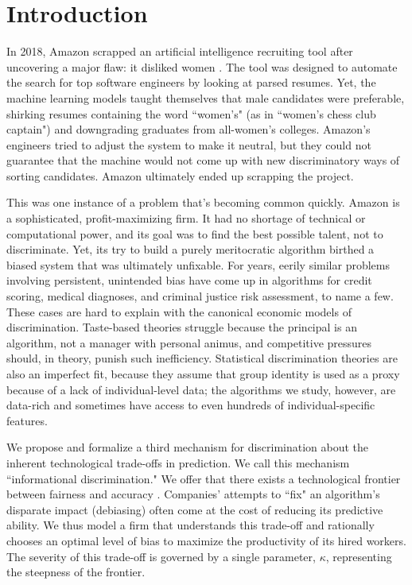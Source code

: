 \section{Introduction}

In 2018, Amazon scrapped an artificial intelligence recruiting tool after uncovering a major flaw: it disliked women \citep{Dastin2018}. The tool was designed to automate the search for top software engineers by looking at parsed resumes. Yet, the machine learning models taught themselves that male candidates were preferable, shirking resumes containing the word ``women's" (as in ``women's chess club captain") and downgrading graduates from all-women's colleges. Amazon's engineers tried to adjust the system to make it neutral, but they could not guarantee that the machine would not come up with new discriminatory ways of sorting candidates. Amazon ultimately ended up scrapping the project.

This was one instance of a problem that's becoming common quickly. Amazon is a sophisticated, profit-maximizing firm. It had no shortage of technical or computational power, and its goal was to find the best possible talent, not to discriminate. Yet, its try to build a purely meritocratic algorithm birthed a biased system that was ultimately unfixable. For years, eerily similar problems involving persistent, unintended bias have come up in algorithms for credit scoring, medical diagnoses, and criminal justice risk assessment, to name a few. These cases are hard to explain with the canonical economic models of discrimination. Taste-based theories \citep{Becker1957} struggle because the principal is an algorithm, not a manager with personal animus, and competitive pressures should, in theory, punish such inefficiency. Statistical discrimination theories \citep{Phelps1972, Arrow1973} are also an imperfect fit, because they assume that group identity is used as a proxy because of a lack of individual-level data; the algorithms we study, however, are data-rich and sometimes have access to even hundreds of individual-specific features.

We propose and formalize a third mechanism for discrimination about the inherent technological trade-offs in prediction. We call this mechanism ``informational discrimination." We offer that there exists a technological frontier between fairness and accuracy \citep{Kleinberg2017, Chouldechova2017}. Companies' attempts to ``fix" an algorithm's disparate impact (debiasing) often come at the cost of reducing its predictive ability. We thus model a firm that understands this trade-off and rationally chooses an optimal level of bias to maximize the productivity of its hired workers. The severity of this trade-off is governed by a single parameter, $\kappa$, representing the steepness of the frontier.

